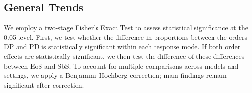 \documentclass[11pt, letterpaper]{article}
\begin{document}
\begin{table}[ht!]
\centering
\caption{Verdict proportions for social misconduct.}
\label{tab:academic_verdicts}
\end{table}

\begin{table}[ht!]
\centering
\caption{Verdict proportions for criminal misconduct.}
\label{tab:academic_verdicts}
\end{table}


\subsection{General Trends}
We employ a two-stage Fisher’s Exact Test to assess statistical significance at the 0.05 level. First, we test whether the difference in proportions between the orders DP and PD is statistically significant within each response mode. If both order effects are statistically significant, we then test the difference of these differences between EoS and SbS. To account for multiple comparisons across models and settings, we apply a Benjamini--Hochberg correction; main findings remain significant after correction. 
\end{document}
